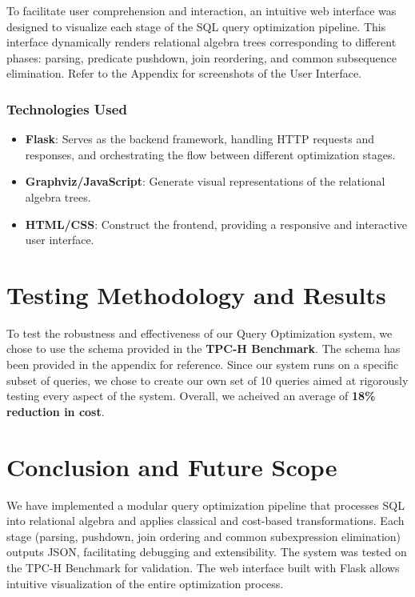 \documentclass[12pt]{article}
\begin{document}
To facilitate user comprehension and interaction, an intuitive web interface was designed to visualize each stage of the SQL query optimization pipeline. This interface dynamically renders relational algebra trees corresponding to different phases: parsing, predicate pushdown, join reordering, and common subsequence elimination. Refer to the Appendix for screenshots of the User Interface.

\subsubsection*{Technologies Used}

\begin{itemize}
\item \textbf{Flask}: Serves as the backend framework, handling HTTP requests and responses, and orchestrating the flow between different optimization stages.
\item \textbf{Graphviz/JavaScript}: Generate visual representations of the relational algebra trees.
\item \textbf{HTML/CSS}: Construct the frontend, providing a responsive and interactive user interface.
\end{itemize}

\section*{Testing Methodology and Results}

To test the robustness and effectiveness of our Query Optimization system, we chose to use the schema provided in the \textbf{TPC-H Benchmark}. The schema has been provided in the appendix for reference. Since our system runs on a specific subset of queries, we chose to create our own set of 10 queries aimed at rigorously testing every aspect of the system. Overall, we acheived an average of \textbf{18\% reduction in cost}. 

\section*{Conclusion and Future Scope}

We have implemented a modular query optimization pipeline that processes SQL into relational algebra and applies classical and cost-based transformations. Each stage (parsing, pushdown, join ordering and common subexpression elimination) outputs JSON, facilitating debugging and extensibility. The system was tested on the TPC-H Benchmark for validation. The web interface built with Flask allows intuitive visualization of the entire optimization process.
\end{document}
